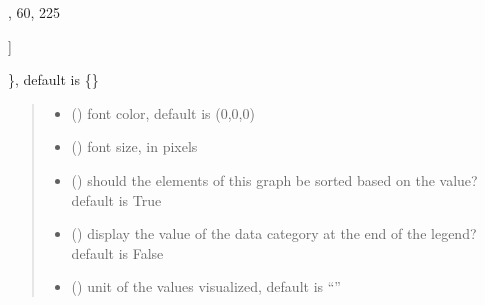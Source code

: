 \documentclass[letterpaper,10pt,english]{sphinxmanual}
\begin{document}
\begin{fulllineitems}
\begin{quote}
\begin{description}
\begin{itemize}
\end{itemize}

\end{description}\end{quote}
\begin{description}
\begin{description}
\sphinxlineitem{\{}\begin{description}
\sphinxlineitem{“United States”: {[}}
,
60,
225

\end{description}

\sphinxAtStartPar
{]}

\end{description}

\sphinxAtStartPar
\}, default is \{\}

\end{description}
\begin{quote}\begin{description}
\begin{itemize}
\item {} 
\sphinxAtStartPar
{} () \textendash{} font color, default is (0,0,0)

\item {} 
\sphinxAtStartPar
{} () \textendash{} font size, in pixels

\item {} 
\sphinxAtStartPar
{} () \textendash{} should the elements of this graph be sorted based on the value? default is True

\item {} 
\sphinxAtStartPar
{} () \textendash{} display the value of the data category at the end of the legend? default is False

\item {} 
\sphinxAtStartPar
{} () \textendash{} unit of the values visualized, default is “”


\end{itemize}
\end{description}
\end{quote}
\end{fulllineitems}
\end{document}

